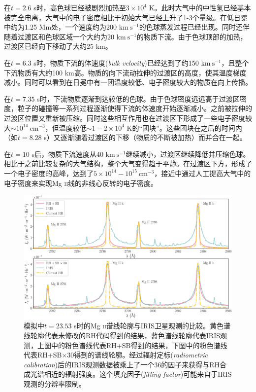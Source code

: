 在$t=2.6$ s时，高色球已经被剧烈加热至$3\times 10^4$ K。此时大气中的中性氢已经基本被完全电离，大气中的电子密度相比于初始大气已经上升了1-3个量级。在低日冕中约为1.25 Mm处，一个速度约为200 $\mathrm{km\  s^{-1}}$的色球蒸发过程已经出现。同时还伴随着过渡区和色球区域一个大约为20 $\mathrm{km\  s^{-1}}$的物质下流。由于色球顶部的加热，过渡区已经向下移动了大约25 km。

在$t=6.3$ s时，物质下流的体速度(\textit{bulk velocity})已经达到了约150 $\mathrm{km\  s^{-1}}$，且整个下流物质有大约100 km高。物质的向下流动拉伸的过渡区的高度，使其温度梯度减小。同时可以看到在日冕中有一团温度较低、电子密度较大的物质在向上传播。

在$t=7.35$ s时，下流物质逐渐到达较低的色球。由于色球密度远远高于过渡区密度，粒子的碰撞等一系列过程逐渐使得下流的体速度开始逐渐减小。之前被拉伸的过渡区位置又重新被压缩。同时这些相互作用也在过渡区下形成了一些电子密度较大$\sim 10^{14}\ \mathrm{cm}^{-3}$，但温度较低$\sim 1-2\times 10^{4}$ K的“团块”。这些团块在之后的时间内（如$t=8.28$ s）又逐渐随着过渡区的下移（物质的不断被加热）而并合在一起。

在$t=10$ s后，物质下流速度从40 $\mathrm{km\  s^{-1}}$继续减小，过渡区继续降低并压缩色球。相比于之前比较复杂的大气结构，整个大气变得趋于平静。在过渡区下方，形成了一个电子密度的高峰，达到了$5\times10^{14}-10^{15}\ \mathrm{cm^{-3}}$，接近\textcites{Rubio2017}中通过人工提高大气中的电子密度来实现Mg \textsc{ii}线的非线心反转的电子密度。

\begin{figure}
	\centering
	\includegraphics[width=\textwidth]{figs/MgII_SB}
	\caption{模拟中$t=23.53$ s时的Mg \textsc{ii}谱线轮廓与IRIS卫星观测的比较。黄色谱线轮廓代表未修改的RH代码得到的结果，蓝色谱线轮廓代表IRIS观测，上图中的粉色谱线代表RH+SB得到的结果，下图中的粉色谱线代表RH+SB$\times$30得到的谱线轮廓。经过辐射定标(\textit{radiometric calibration})后的IRIS观测数据被乘上了一个36的因子来获得与RH合成光谱相近的辐射强度。这个填充因子(\textit{filling factor})可能来自于IRIS观测的分辨率限制。}\label{fig:3.2}
\end{figure}

